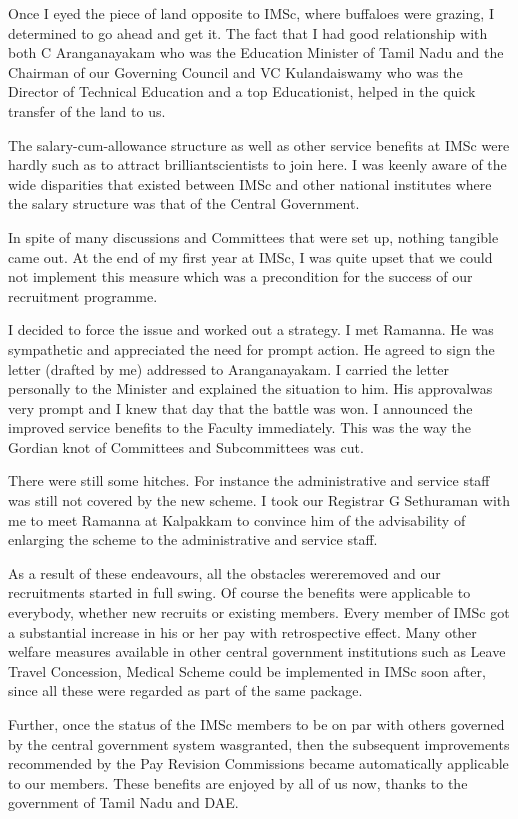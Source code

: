 Once I eyed the piece of land opposite to IMSc, where buffaloes were 
grazing, I determined to go ahead and get it. The fact that I had good 
relationship with both C Aranganayakam who was the Education Minister of 
Tamil Nadu and the Chairman of our Governing Council and VC 
Kulandaiswamy who was the Director of Technical Education and a top 
Educationist, helped in the quick transfer of the land to us.

The salary-cum-allowance structure as well as other service benefits at 
IMSc were hardly such as to attract brilliant\break scientists to join here. I 
was keenly aware of the wide disparities that existed between IMSc and 
other national institutes where the salary structure was that of the 
Central Government.

In spite of many discussions and Committees that were set up, nothing 
tangible came out. At the end of my first year at IMSc, I was quite 
upset that we could not implement this measure which was a precondition 
for the success of our recruitment programme.

I decided to force the issue and worked out a strategy. I met Ramanna. 
He was sympathetic and appreciated the need for prompt action. He agreed 
to sign the letter (drafted by me) addressed to Aranganayakam. I carried 
the letter personally to the Minister and explained the situation to 
him. His approval\break was very prompt and I knew that day that the battle 
was won. I announced the improved service benefits to the Faculty\break 
immediately. This was the way the Gordian knot of Committees and 
Subcommittees was cut.

There were still some hitches. For instance the administrative and 
service staff was still not covered by the new scheme. I took our 
Registrar G Sethuraman with me to meet Ramanna at Kalpakkam to convince 
him of the advisability of enlarging the scheme to the administrative 
and service staff.

As a result of these endeavours, all the obstacles were\break removed and our 
recruitments started in full swing. Of course the benefits were 
applicable to everybody, whether new recruits or existing members. Every 
member of IMSc got a substantial increase in his or her pay with 
retrospective effect. Many other welfare measures available in other 
central government institutions such as Leave Travel Concession, Medical 
Scheme could be implemented in IMSc soon after, since all these were 
regarded as part of the same package.

Further, once the status of the IMSc members to be on par with others 
governed by the central government system was\break granted, then the 
subsequent improvements recommended by the Pay Revision Commissions 
became automatically applicable to our members. These benefits are 
enjoyed by all of us now, thanks to the government of Tamil Nadu and 
DAE.


